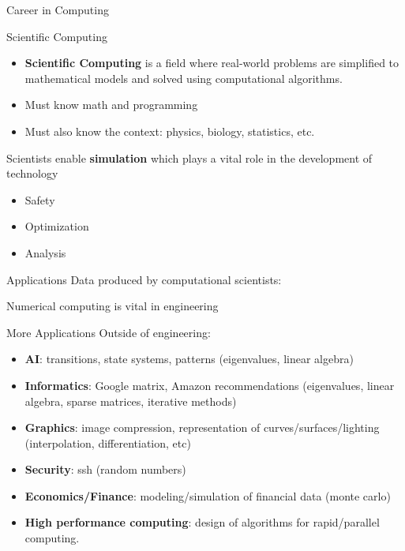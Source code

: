 \documentclass[10pt]{beamer}
\begin{document}
\begin{frame}{Career in Computing}
\begin{block}{Scientific Computing}
\begin{itemize}
    \item \textbf{Scientific Computing} is a field where real-world problems are simplified to mathematical models and solved using computational algorithms.
    \item Must know math and programming
    \item Must also know the context: physics, biology, statistics, etc.
\end{itemize}
\end{block}
\bigskip
Scientists enable \textbf{simulation} which plays a vital role in the development of technology
\begin{itemize}
\item Safety
\item Optimization 
\item Analysis 
\end{itemize}
\end{frame}
\begin{frame}{Applications}
Data produced by computational scientists:
\begin{center}
Numerical computing is vital in engineering
\end{center}
\end{frame}


\begin{frame}{More Applications}
Outside of engineering:
\begin{itemize}
    \item \textbf{AI}:  transitions, state systems, patterns (eigenvalues, linear algebra)
    \item \textbf{Informatics}:  Google matrix, Amazon recommendations (eigenvalues, linear
    algebra, sparse matrices, iterative methods)
    \item \textbf{Graphics}:  image compression, representation of
    curves/surfaces/lighting (interpolation, differentiation, etc)
    \item \textbf{Security}:  ssh (random numbers)
    \item \textbf{Economics/Finance}:  modeling/simulation of financial data (monte carlo)
    \item \textbf{High performance computing}: design of algorithms for rapid/parallel computing.
    \end{itemize}
\end{frame}
\end{document}
